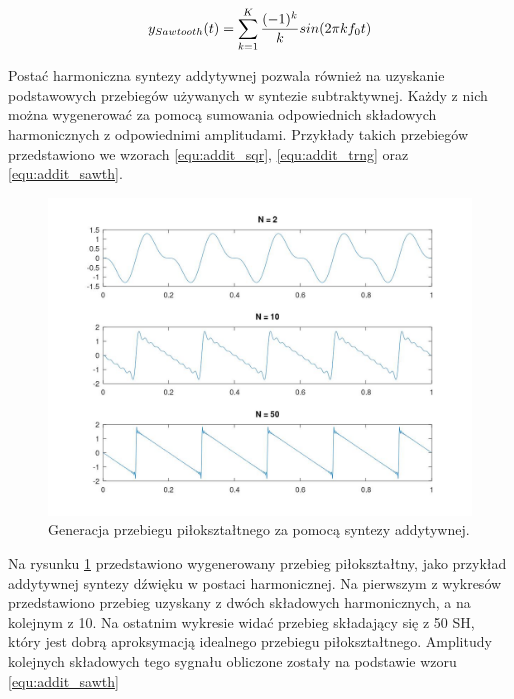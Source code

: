 \begin{equation} \label{equ:addit_sawth}
y_{Sawtooth}(t) = \sum_{k=1}^{K} \frac{(-1)^k}{k} sin(2\pi kf_{0}t) \\
\end{equation}

Postać harmoniczna syntezy addytywnej pozwala również na uzyskanie podstawowych przebiegów używanych w syntezie subtraktywnej. Każdy z nich można wygenerować za pomocą sumowania odpowiednich składowych harmonicznych z odpowiednimi amplitudami. Przykłady takich przebiegów przedstawiono we wzorach \ref{equ:addit_sqr}, \ref{equ:addit_trng} oraz \ref{equ:addit_sawth}.

\begin{figure}[H]
	\centering
	\includegraphics[width=12cm]{grafiki/add_sawtooth}
	\captionsetup{justification=centering}
	\caption{Generacja przebiegu piłokształtnego za pomocą syntezy addytywnej.}
	\label{rys:add_sawtooth}
\end{figure}

Na rysunku \ref{rys:add_sawtooth} przedstawiono wygenerowany przebieg piłokształtny, jako przykład addytywnej syntezy dźwięku w postaci harmonicznej. Na pierwszym z wykresów przedstawiono przebieg uzyskany z dwóch składowych harmonicznych, a na kolejnym z 10. Na ostatnim wykresie widać przebieg składający się z 50 SH, który jest dobrą aproksymacją idealnego przebiegu piłokształtnego. Amplitudy kolejnych składowych tego sygnału obliczone zostały na podstawie wzoru \ref{equ:addit_sawth}

